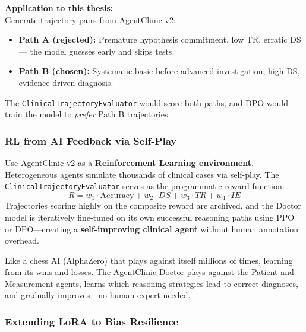\textbf{Application to this thesis:}\\
Generate trajectory pairs from AgentClinic v2:
\begin{itemize}
    \item \textbf{Path A (rejected):} Premature hypothesis commitment, low TR, erratic DS --- the model guesses early and skips tests.
    \item \textbf{Path B (chosen):} Systematic basic-before-advanced investigation, high DS, evidence-driven diagnosis.
\end{itemize}
The \texttt{ClinicalTrajectoryEvaluator} would score both paths, and DPO would train the model to \textit{prefer} Path B trajectories.

\subsubsection{RL from AI Feedback via Self-Play}

\begin{acadbox}[\textcolor{white}{Academic Definition}]
Use AgentClinic v2 as a \textbf{Reinforcement Learning environment}. Heterogeneous agents simulate thousands of clinical cases via self-play. The \texttt{ClinicalTrajectoryEvaluator} serves as the programmatic reward function:
\[
R = w_1 \cdot \text{Accuracy} + w_2 \cdot DS + w_3 \cdot TR + w_4 \cdot IE
\]
Trajectories scoring highly on the composite reward are archived, and the Doctor model is iteratively fine-tuned on its own successful reasoning paths using PPO or DPO---creating a \textbf{self-improving clinical agent} without human annotation overhead.
\end{acadbox}

\begin{analogybox}[\textcolor{white}{Simple Analogy}]
Like a chess AI (AlphaZero) that plays against itself millions of times, learning from its wins and losses. The AgentClinic Doctor plays against the Patient and Measurement agents, learns which reasoning strategies lead to correct diagnoses, and gradually improves---no human expert needed.
\end{analogybox}

\subsubsection{Extending LoRA to Bias Resilience}

